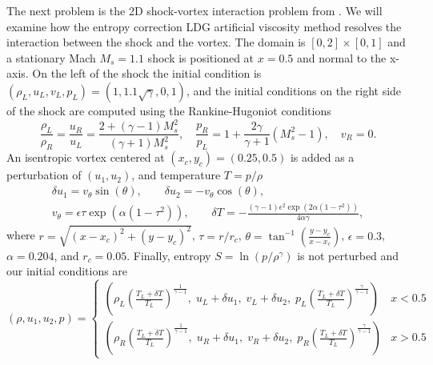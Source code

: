 \documentclass{elsarticle}
\theoremstyle{definition}
\theoremstyle{plain}
\theoremstyle{plain}
\newcommand{\refone}[1]{{\color{red}#1}}
\newcommand{\reftwo}[1]{{\color{blue}#1}}
\renewcommand{\refone}[1]{#1}
\renewcommand{\reftwo}[1]{#1}
\begin{document}
The next problem is the 2D shock-vortex interaction problem from \cite{Shu1998Vortex}. We will examine how the entropy correction LDG artificial viscosity method resolves the interaction between the shock and the vortex. The domain is $[0,2] \times [0,1]$ and a stationary Mach $M_s = 1.1$ shock is positioned at $x = 0.5$ and normal to the x-axis. On the left of the shock the initial condition is 
$
(\rho_L, u_L, v_L, p_L) = (1, \reftwo{1.1\sqrt{\gamma}},0,1)
$, and the initial conditions on the right side of the shock are computed using the Rankine-Hugoniot conditions 
$$
\frac{\rho_L}{\rho_R} = \reftwo{\frac{u_R}{u_L}} = \frac{2+(\gamma - 1) M_s^2}{(\gamma + 1)M_s^2}, \quad \reftwo{\frac{p_R}{p_L}} = 1 + \frac{2\gamma}{\gamma + 1} (M_s^2 - 1), \quad v_R = 0.
$$
An isentropic vortex centered at $(x_c,y_c) = (0.25,0.5)$ is added as a perturbation of $(u_1,u_2)$, and temperature $T = p/\rho$
\begin{gather*}
\delta u_1 = v_{\theta}\sin{(\theta)}, \qquad \delta u_2 = -v_{\theta}\cos{(\theta)}, \\ 
 v_{\theta} = \epsilon \tau \exp{(\alpha(1-\tau^2))}, \qquad \delta T = -\frac{(\gamma - 1)\epsilon^2\exp{(2\alpha(1-\tau^2))}}{4\alpha \gamma} \refone{,}
\end{gather*}
where $r = \sqrt{(x-x_c)^2 + (y-y_c)^2}$, $\tau = r/r_c$, $\theta = \tan^{-1}(\frac{y-y_c}{x-x_c})$, $\epsilon = 0.3$, $\alpha = 0.204$, and $r_c = 0.05$. Finally, entropy $S = \ln{(p/\rho^{\gamma})}$ is not perturbed and our initial conditions are 
$$
(\rho,u_1,u_2,p) = \begin{cases} \left(\rho_L\left(\frac{T_L + \delta T}{T_L}\right)^{\frac{1}{\gamma-1}}, \; u_L + \delta u_1, \; v_L + \delta u_2, \; p_L\left(\frac{T_L + \delta T}{T_L}\right)^{\reftwo{\frac{\gamma}{\gamma-1}}}\right) & x < 0.5\\
\left(\rho_R\left(\frac{T_L + \delta T}{T_L}\right)^{\frac{1}{\gamma-1}}, \; u_R + \delta u_1, \; v_R + \delta u_2, \; p_R\left(\frac{T_L + \delta T}{T_L}\right)^{\reftwo{\frac{\gamma}{\gamma-1}}}\right) & x > 0.5
\end{cases}
$$
\end{document}
